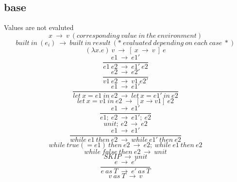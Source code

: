 \documentclass[10pt,a4paper]{article}
\begin{document}
\subsection*{ base }
Values are not evaluted
\begin{equation}x\ \rightarrow \ v\ (corresponding\ value\ in\ the\ environment)\ \tag{\ E-VARIABLE\ }\end{equation}
\begin{equation}built\ in\ (e_i)\ \rightarrow \ built\ in\ result                           \ (*\ evaluated\ depending\ on\ each\ case\ *)\ \tag{\ E-BUILTIN\ }\end{equation}
\begin{equation}(\lambda x.e)\ v\ \rightarrow \ [\ x\ \rightarrow \ v\ ]\ e\ \tag{\ E-LAMBDA\ }\end{equation}
\begin{equation}\frac{e1\ \rightarrow \ e1'}{e1\ e2\ \rightarrow \ e1'\ e2}\ \tag{\ E-APP1\ }\end{equation}
\begin{equation}\frac{e2\ \rightarrow \ e2'}{v1\ e2\ \rightarrow \ v1\ e2'}\ \tag{\ E-APP2\ }\end{equation}
\begin{equation}\frac{e1\ \rightarrow \ e1'}{let\ x=e1\ in\ e2\ \rightarrow \ let\ x=e1'\ in\ e2}\ \tag{\ E-LET\ }\end{equation}
\begin{equation}let\ x=v1\ in\ e2\ \rightarrow \ [x\rightarrow v1]\ e2\ \tag{\ E-LETIN\ }\end{equation} 
\begin{equation}\frac{e1\ \rightarrow \ e1'}{e1;\ e2\ \rightarrow \ e1';\ e2}\ \tag{\ E-SEQ\ }\end{equation}
\begin{equation}unit;\ e2\ \rightarrow \ e2\ \tag{\ E-SEQNEXT\ }\end{equation}
\begin{equation}\frac{e1\ \rightarrow \ e1'}{while\ e1\ then\ e2\ \rightarrow \ while\ e1'\ then\ e2}\ \tag{\ E-LOOP\ }\end{equation}
\begin{equation}while\ true(=e1)\ then\ e2\ \rightarrow \ e2;\ while\ e1\ then\ e2\ \tag{\ E-LOOPTRUE\ }\end{equation}
\begin{equation}while\ false\ then\ e2\ \rightarrow \ unit\ \tag{\ E-LOOPFALSE\ }\end{equation}
\begin{equation}SKIP\ \rightarrow \ unit\ \tag{\ E-SKIP\ }\end{equation}
\begin{equation}\frac{e\ \rightarrow \ e'}{e\ as\ T\ \rightarrow \ e'\ as\ T}\ \tag{\ E-ASCR1\ }\end{equation}
\begin{equation}v\ as\ T \ \rightarrow \ v\ \tag{\ E-ASCR2\ }\end{equation}  
\end{document}
